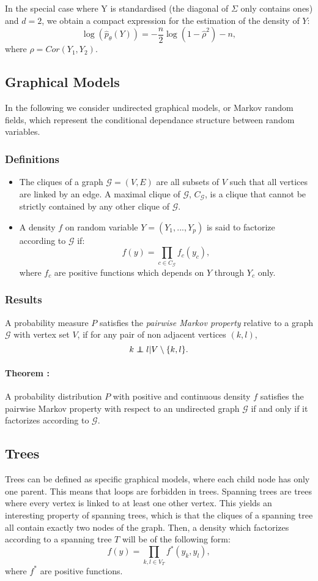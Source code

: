 \documentclass[a4paper,11pt]{article}
\newcommand\independent{\protect\mathpalette{\protect\independenT}{\perp}}
\def\independenT#1#2{\mathrel{\rlap{$#1#2$}\mkern2mu{#1#2}}}
\begin{document}
In the special case where Y is standardised (the diagonal of $\Sigma$ only contains ones) and $d=2$, we obtain a compact expression for the
estimation of the density of $Y$:
  \begin{equation}
   \label{gauss}
   \log(\hat{p}_\theta(Y))=-\frac{n}{2}\log(1-\hat{\rho}^2)-n,
   \end{equation}
where $\rho = Cor(Y_1,Y_2)$.
  \subsection{Graphical Models}
  In the following we consider undirected graphical models, or Markov random fields, which represent the conditional dependance structure
  between random variables.
  \subsubsection{Definitions}
  \begin{itemize}
  \item The cliques of a graph $\mathcal{G}=(V,E)$ are all subsets of $V$ such that all vertices are linked by an edge. A maximal clique of $\mathcal{G}$,
  $C_\mathcal{G}$, is a clique that cannot be strictly contained by any other clique of $\mathcal{G}$.\\
  \item A density $f$ on random variable $Y=(Y_1,...,Y_p)$ is said to factorize according to $\mathcal{G}$ if:
  \[f(y)= \prod_{c\in C_\mathcal{G}} f_c(y_c),\]
  where $f_c$ are positive functions which depends on $Y$ through $Y_c$ only.
  \end{itemize}
  \subsubsection{Results}
  A probability measure $P$ satisfies the \textit{pairwise Markov property} relative to a graph $\mathcal{G}$ with vertex set $V$,
  if for any pair of non adjacent vertices $(k,l)$,
  \[k \independent l|V\setminus\{k,l\}.\]
  
  \paragraph{Theorem  \cite{ham}:} A probability distribution $P$ with positive and continuous density $f$ satisfies
  the pairwise Markov property with respect to an undirected graph $\mathcal{G}$ if and only if it factorizes according to $\mathcal{G}$.
  
  
  \subsection{Trees}
  Trees can be defined as specific graphical models, where each child node has only one parent. This means that loops are forbidden in trees.
  Spanning trees are trees where every vertex is linked to at least one other vertex. This yields an interesting property of spanning trees, which 
  is that the cliques of a spanning tree all contain exactly two nodes of the graph. Then, a density which factorizes according to a spanning
  tree $T$ will be of the following form:
  \[f(y)= \prod_{k,l\in V_T} f^*(y_k,y_l),\]
  where $f^*$ are positive functions.
  
\end{document}
